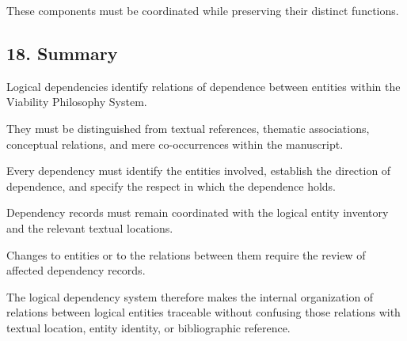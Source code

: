 These components must be
coordinated while preserving
their distinct functions.


\subsection*{18. Summary}

Logical dependencies identify
relations of dependence
between entities within
the Viability Philosophy
System.

They must be distinguished
from textual references,
thematic associations,
conceptual relations,
and mere co-occurrences
within the manuscript.

Every dependency must
identify the entities
involved, establish the
direction of dependence,
and specify the respect
in which the dependence
holds.

Dependency records must
remain coordinated with
the logical entity inventory
and the relevant textual
locations.

Changes to entities or
to the relations between
them require the review
of affected dependency
records.

The logical dependency
system therefore makes
the internal organization
of relations between
logical entities traceable
without confusing those
relations with textual
location, entity identity,
or bibliographic reference.

\cleardoublepage

